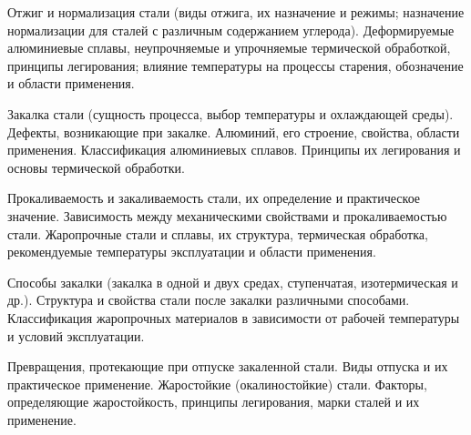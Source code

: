 \documentclass[
	14pt,
	a4paper,
	]
	{scrartcl}
\begin{document}
\vfill

\newpage


\shapk
{}
\setcounter{zad}{0}

\vfill
\z Отжиг и нормализация стали (виды отжига, их назначение и режимы; назначение нормализации для сталей с различным содержанием углерода).
 \vfill
\z Деформируемые алюминиевые сплавы, неупрочняемые и упрочняемые термической обработкой, принципы легирования; влияние температуры на процессы старения, обозначение и области применения.
 \vfill

\vfill

\newpage


\shapk
{}
\setcounter{zad}{0}

\vfill
\z Закалка стали (сущность процесса, выбор температуры и охлаждающей среды). Дефекты, возникающие при закалке.
 \vfill
\z Алюминий, его строение, свойства, области применения. Классификация алюминиевых сплавов. Принципы их легирования и основы термической обработки.
 \vfill

\vfill

\newpage


\shapk
{}
\setcounter{zad}{0}

\vfill
\z Прокаливаемость и закаливаемость стали, их определение и практическое значение. Зависимость между механическими свойствами и прокаливаемостью стали.
 \vfill
\z Жаропрочные стали и сплавы, их структура, термическая обработка, рекомендуемые температуры эксплуатации и области применения.
 \vfill

\vfill

\newpage


\shapk
{}
\setcounter{zad}{0}

\vfill
\z Способы закалки (закалка в одной и двух средах, ступенчатая, изотермическая и др.). Структура и свойства стали после закалки различными способами.
 \vfill
\z Классификация жаропрочных материалов в зависимости от рабочей температуры и условий эксплуатации.
 \vfill

\vfill

\newpage


\shapk
{}
\setcounter{zad}{0}

\vfill
\z Превращения, протекающие при отпуске закаленной стали. Виды отпуска и их практическое применение.
 \vfill
\z Жаростойкие (окалиностойкие) стали. Факторы, определяющие жаростойкость, принципы легирования, марки сталей и их применение.
 \vfill
\end{document}
